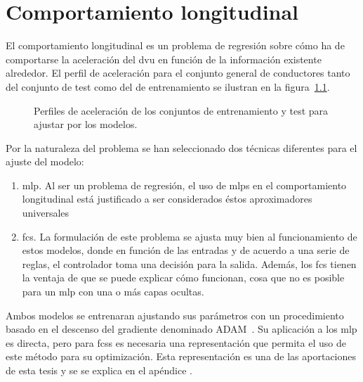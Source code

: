 \chapter{Comportamiento longitudinal}
\label{ch:longitudinal-model}

El comportamiento longitudinal es un problema de regresión sobre cómo ha de comportarse la aceleración del \ac{dvu} en función de la información existente alrededor. El perfil de aceleración para el conjunto general de conductores tanto del conjunto de test como del de entrenamiento se ilustran en la figura~\ref{fig:acceleration-profiles}.

\begin{figure}
	\centering
	\qquad
	\caption[Perfiles de aceleración a ajustar por los modelos. Conjuntos de entrenamiento y de test]{Perfiles de aceleración de los conjuntos de entrenamiento y test para ajustar por los modelos.}
	\label{fig:acceleration-profiles}
\end{figure}

Por la naturaleza del problema se han seleccionado dos técnicas diferentes para el ajuste del modelo:

\begin{enumerate}
	\item \ac{mlp}. Al ser un problema de regresión, el uso de \acp{mlp} en el comportamiento longitudinal está justificado a ser considerados éstos aproximadores universales~\cite{hornik1991approximation}
	\item \ac{fcs}. La formulación de este problema se ajusta muy bien al funcionamiento de estos modelos, donde en función de las entradas y de acuerdo a una serie de reglas, el controlador toma una decisión para la salida. Además, los \ac{fcs} tienen la ventaja de que se puede explicar cómo funcionan, cosa que no es posible para un \ac{mlp} con una o más capas ocultas.
\end{enumerate}

Ambos modelos se entrenaran ajustando sus parámetros con un procedimiento basado en el descenso del gradiente denominado ADAM~\cite{kingma2014adam}. Su aplicación a los \ac{mlp} es directa, pero para \acp{fcs} es necesaria una representación que permita el uso de este método para su optimización. Esta representación es una de las aportaciones de esta tesis y se se explica en el apéndice .

